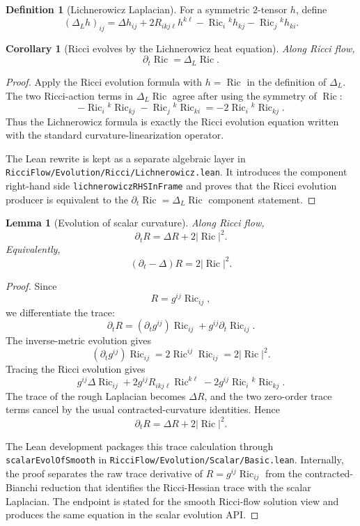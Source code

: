\documentclass[11pt]{article}
\theoremstyle{plain}
\newtheorem{lemma}[theorem]{Lemma}
\newtheorem{corollary}[theorem]{Corollary}
\theoremstyle{definition}
\newtheorem{definition}[theorem]{Definition}
\theoremstyle{remark}
\newcommand{\Ric}{\operatorname{Ric}}
\newcommand{\norm}[1]{\left|#1\right|}
\newcommand{\leanref}[1]{\nolinkurl{#1}}
\newcommand{\leanfile}[1]{\nolinkurl{#1}}
\newcommand{\rffile}[1]{\leanfile{#1}}
\begin{document}
\begin{definition}[Lichnerowicz Laplacian]
\label{def:lichnerowicz-laplacian}
For a symmetric $2$-tensor $h$, define
\[
(\Delta_Lh)_{ij}
=
\Delta h_{ij}
+2R_{ikj\ell}h^{k\ell}
-\Ric_i{}^kh_{kj}
-\Ric_j{}^kh_{ki}.
\]
\end{definition}

\begin{corollary}[Ricci evolves by the Lichnerowicz heat equation]
\label{cor:ricci-lichnerowicz}
Along Ricci flow,
\[
\partial_t\Ric=\Delta_L\Ric.
\]
\end{corollary}

\begin{proof}
Apply the Ricci evolution formula with \(h=\Ric\) in the definition of
\(\Delta_L\).  The two Ricci-action terms in \(\Delta_L\Ric\) agree after using
the symmetry of \(\Ric\):
\[
  -\Ric_i{}^k\Ric_{kj}
  -
  \Ric_j{}^k\Ric_{ki}
  =
  -2\Ric_i{}^k\Ric_{kj}.
\]
Thus the Lichnerowicz formula is exactly the Ricci evolution equation written
with the standard curvature-linearization operator.

The Lean rewrite is kept as a separate algebraic layer in
\rffile{RicciFlow/Evolution/Ricci/Lichnerowicz.lean}.  It introduces the
component right-hand side \leanref{lichnerowiczRHSInFrame} and proves that the
Ricci evolution producer is equivalent to the \(\partial_t\Ric=\Delta_L\Ric\)
component statement.
\end{proof}

\begin{lemma}[Evolution of scalar curvature]
\label{lem:evol-scalar}
Along Ricci flow,
\[
\partial_tR=\Delta R+2\norm{\Ric}^2.
\]
Equivalently,
\[
(\partial_t-\Delta)R=2\norm{\Ric}^2.
\]
\end{lemma}

\begin{proof}
Since
\[
  R=g^{ij}\Ric_{ij},
\]
we differentiate the trace:
\[
  \partial_tR
  =
  (\partial_tg^{ij})\Ric_{ij}
  +
  g^{ij}\partial_t\Ric_{ij}.
\]
The inverse-metric evolution gives
\[
  (\partial_tg^{ij})\Ric_{ij}
  =
  2\Ric^{ij}\Ric_{ij}
  =
  2\norm{\Ric}^2.
\]
Tracing the Ricci evolution gives
\[
  g^{ij}\Delta\Ric_{ij}
  +
  2g^{ij}R_{ikj\ell}\Ric^{k\ell}
  -
  2g^{ij}\Ric_i{}^k\Ric_{kj}.
\]
The trace of the rough Laplacian becomes \(\Delta R\), and the two zero-order
trace terms cancel by the usual contracted-curvature identities.  Hence
\[
  \partial_tR=\Delta R+2\norm{\Ric}^2.
\]

The Lean development packages this trace calculation through
\leanref{scalarEvolOfSmooth} in \rffile{RicciFlow/Evolution/Scalar/Basic.lean}.
Internally, the proof separates the raw trace derivative of \(R=g^{ij}\Ric_{ij}\)
from the contracted-Bianchi reduction that identifies the Ricci-Hessian trace
with the scalar Laplacian.  The endpoint is stated for the smooth Ricci-flow
solution view and produces the same equation in the scalar evolution API.
\end{proof}
\end{document}
